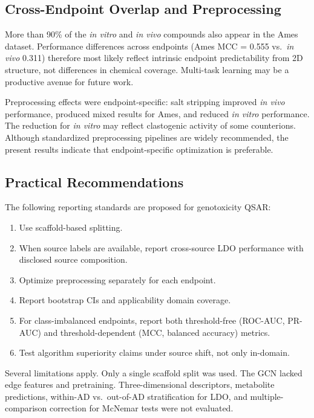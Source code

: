 \documentclass[journal=jacsat,manuscript=article]{achemso}
\begin{document}
\subsection{Cross-Endpoint Overlap and Preprocessing}

More than 90\% of the \textit{in vitro} and \textit{in vivo} compounds also appear in the Ames dataset. 
Performance differences across endpoints (Ames MCC = 0.555 vs.\ \textit{in vivo} 0.311) therefore 
most likely reflect intrinsic endpoint predictability from 2D structure, not differences in 
chemical coverage.\cite{Tropsha_2010} Multi-task learning may be a productive avenue for 
future work.\cite{Ramsundar_2015}

Preprocessing effects were endpoint-specific: salt stripping improved \textit{in vivo} performance, 
produced mixed results for Ames, and reduced \textit{in vitro} performance. The reduction for 
\textit{in vitro} may reflect clastogenic activity of some counterions. Although standardized 
preprocessing pipelines are widely recommended,\cite{Fourches_2010,Fourches_2016} the 
present results indicate that endpoint-specific optimization is preferable.

\subsection{Practical Recommendations}

The following reporting standards are proposed for genotoxicity QSAR:

\begin{enumerate}
    \item Use scaffold-based splitting.
    \item When source labels are available, report cross-source LDO performance with 
    disclosed source composition.
    \item Optimize preprocessing separately for each endpoint.
    \item Report bootstrap CIs and applicability domain coverage.
    \item For class-imbalanced endpoints, report both threshold-free (ROC-AUC, PR-AUC) and 
    threshold-dependent (MCC, balanced accuracy) metrics.
    \item Test algorithm superiority claims under source shift, not only in-domain.
\end{enumerate}

Several limitations apply. Only a single scaffold split was used. The GCN lacked edge 
features and pretraining.\cite{Hu_2020_pretrain} Three-dimensional descriptors, metabolite 
predictions, within-AD vs.\ out-of-AD stratification for LDO, and multiple-comparison 
correction for McNemar tests\cite{Demsar_2006} were not evaluated.
\end{document}
